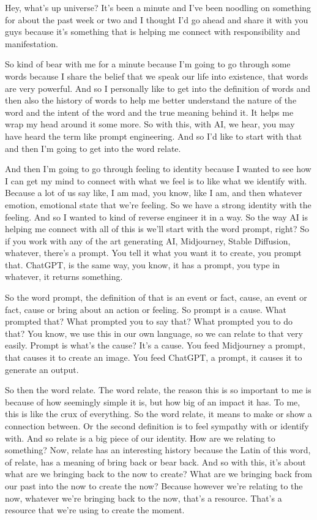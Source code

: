 \documentclass{article}
\begin{document}
Hey, what's up universe? It's been a minute and I've been noodling on something for about the past week or two and I thought I'd go ahead and share it with you guys because it's something that is helping me connect with responsibility and manifestation.

So kind of bear with me for a minute because I'm going to go through some words because I share the belief that we speak our life into existence, that words are very powerful. And so I personally
like to get into the definition of words and then also the history of words to help me better
understand the nature of the word and the intent of the word and the true meaning behind it. It
helps me wrap my head around it some more. So with this, with AI, we hear, you may have heard
the term like prompt engineering. And so I'd like to start with that and then I'm going to get into
the word relate. 

And then I'm going to go through feeling to identity because I wanted to see how
I can get my mind to connect with what we feel is to like what we identify with. Because a lot
of us say like, I am mad, you know, like I am, and then whatever emotion, emotional state that
we're feeling. So we have a strong identity with the feeling. And so I wanted to kind of reverse
engineer it in a way. So the way AI is helping me connect with all of this is we'll start with
the word prompt, right? So if you work with any of the art generating AI, Midjourney,
Stable Diffusion, whatever, there's a prompt. You tell it what you want it to create, you prompt
that. ChatGPT, is the same way, you know, it has a prompt, you type in whatever, it returns something.

So the word prompt, the definition of that is an event or fact, cause, an event or fact, cause or
bring about an action or feeling. So prompt is a cause. What prompted that? What prompted you to
say that? What prompted you to do that? You know, we use this in our own language, so we can relate
to that very easily. Prompt is what's the cause? It's a cause. You feed Midjourney a prompt, that
causes it to create an image. You feed ChatGPT, a prompt, it causes it to generate an output.

So then the word relate. The word relate, the reason this is so important to me is because
of how seemingly simple it is, but how big of an impact it has. To me, this is like the
crux of everything. So the word relate, it means to make or show a connection between.
Or the second definition is to feel sympathy with or identify with. And so relate is a big
piece of our identity. How are we relating to something? Now, relate has an interesting history
because the Latin of this word, of relate, has a meaning of bring back or bear back. And so
with this, it's about what are we bringing back to the now to create? What are we bringing back
from our past into the now to create the now? Because however we're relating to the now,
whatever we're bringing back to the now, that's a resource. That's a resource that we're using to
create the moment. 
\end{document}
